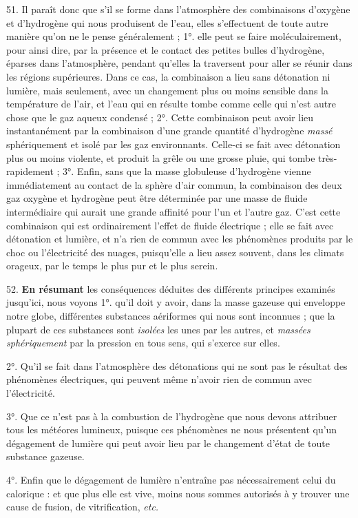 \documentclass[a4paper, 11pt, oneside, polutonikogreek, french]{article}
\begin{document}
51. Il paraît donc que s'il se forme dans l'atmosphère des combinaisons d'oxygène et d'hydrogène qui nous produisent de l'eau, elles s'effectuent de toute autre manière qu'on ne le pense généralement ; 1°. elle peut se faire moléculairement, pour ainsi dire, par la présence et le contact des petites bulles d'hydrogène, éparses dans l'atmosphère, pendant qu'elles la traversent pour aller se réunir dans les régions supérieures. Dans ce cas, la combinaison a lieu sans détonation ni lumière, mais seulement, avec un changement plus ou moins sensible dans la température de l'air, et l'eau qui en résulte tombe comme celle qui n'est autre chose que le gaz aqueux condensé ; 2°. Cette combinaison peut avoir lieu instantanément par la combinaison d'une grande quantité d'hydrogène \emph{massé} sphériquement et isolé par les gaz environnants. Celle-ci se fait avec détonation plus ou moins violente, et produit la grêle ou une grosse pluie, qui tombe très-rapidement ; 3°. Enfin, sans que la masse globuleuse d'hydrogène vienne immédiatement au contact de la sphère d'air commun, la combinaison des deux gaz oxygène et hydrogène peut être déterminée par une masse de fluide intermédiaire qui aurait une grande affinité pour l'un et l'autre gaz. C'est cette combinaison qui est ordinairement l'effet de fluide électrique ; elle se fait avec détonation et lumière, et n'a rien de commun avec les phénomènes produits par le choc ou l'électricité des nuages, puisqu'elle a lieu assez souvent, dans les climats orageux, par le temps le plus pur et le plus serein.

52. \textbf{En résumant} les conséquences déduites des différents principes examinés jusqu'ici, nous voyons 1°. qu'il doit y avoir, dans la masse gazeuse qui enveloppe notre globe, différentes substances aériformes qui nous sont inconnues ; que la plupart de ces substances sont \emph{isolées} les unes par les autres, et \emph{massées sphériquement} par la pression en tous sens, qui s'exerce sur elles.

2°. Qu'il se fait dans l'atmosphère des détonations qui ne sont pas le résultat des phénomènes électriques, qui peuvent même n'avoir rien de commun avec l'électricité.

3°. Que ce n'est pas à la combustion de l'hydrogène que nous devons attribuer tous les météores lumineux, puisque ces phénomènes ne nous présentent qu'un dégagement de lumière qui peut avoir lieu par le changement d'état de toute substance gazeuse.

4°. Enfin que le dégagement de lumière n'entraîne pas nécessairement celui du calorique : et que plus elle est vive, moins nous sommes autorisés à y trouver une cause de fusion, de vitrification, \emph{etc.}
\end{document}
